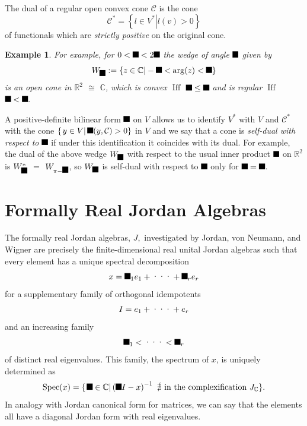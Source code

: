 \documentclass[aps,preprint]{revtex4}%
\providecommand{\U}[1]{\protect\rule{.1in}{.1in}}
\newtheorem{example}[theorem]{Example}
\begin{document}
The dual of a regular open convex cone $\mathcal{C}$ is the cone
\begin{equation}
\mathcal{C}^{\ast}=\left\{  \left.  l\in V^{\ast}\right\vert l\left(
v\right)  >0\right\}
\end{equation}
of functionals which are \emph{strictly positive }on the original cone. 

\begin{example}
For example, for $0<\U{3b8} <2\U{3c0} $ the wedge of angle $\U{3b8} $ given
by
\begin{equation}
W_{\U{3b8} }:=\{z\in\mathbb{C}|-\U{3b8} <\arg(z)<\U{3b8} \}
\end{equation}
is an open cone in $\mathbb{R}^{2}$ $\cong$ $\mathbb{C}$, which is convex
$\operatorname*{Iff}$ $\U{3b8} \leq\U{3c0} $ and is regular
$\operatorname*{Iff}$ $\U{3b8} <\U{3c0} .$
\end{example}

A positive-definite bilinear form $\U{3c3} $ on $V$ allows us to identify
$V^{\ast}$ with $V$ and $\mathcal{C}^{\ast}$ with the cone $\left\{  \left.
y\in V\right\vert \U{3c3} (y,\mathcal{C})>0\right\}  $ in $V$ and we say that
a cone is\emph{ self-dual with respect to }$\U{3c3} $ if under this
identification it coincides with its dual. For example, the dual of the above
wedge $W_{\U{3b8} }$ with respect to the usual inner product $\U{3c3} $ on
$\mathbb{R}^{2}$ is $W_{\U{3b8} }^{\ast}$ $=$ $W_{\pi-\U{3b8} }$, so
$W_{\U{3b8} }$ is self-dual with respect to $\U{3c3} $ only for $\U{3b8}
=\U{3c0} $.

\section{Formally Real Jordan Algebras}

The formally real Jordan algebras, $J,$ investigated by Jordan, von Neumann,
and Wigner are precisely the finite-dimensional real unital Jordan algebras
such that every element has a unique spectral decomposition
\begin{equation}
x=\U{3bb} _{1}e_{1}+\text{\textperiodcentered\textperiodcentered
\textperiodcentered}+\U{3bb} _{r}e_{r}%
\end{equation}
for a supplementary family of orthogonal idempotents
\begin{equation}
I=e_{1}+\text{\textperiodcentered\textperiodcentered\textperiodcentered}+e_{r}%
\end{equation}
and an increasing family%
\begin{equation}
\U{3bb} _{1}<\text{\textperiodcentered\textperiodcentered\textperiodcentered
}<\U{3bb} _{r}%
\end{equation}
of distinct real eigenvalues. This family, the spectrum of $x$, is uniquely
determined as
\begin{equation}
\operatorname*{Spec}(x)=\{\left.  \U{3bb} \in\mathbb{C}\right\vert \left(
\U{3bb} I-x\right)  ^{-1}\text{ }\nexists\text{ in the complexification
}J_{\mathbb{C}}\}.
\end{equation}
In analogy with Jordan canonical form for matrices, we can say that the
elements all have a diagonal Jordan form with real eigenvalues. 
\end{document}
